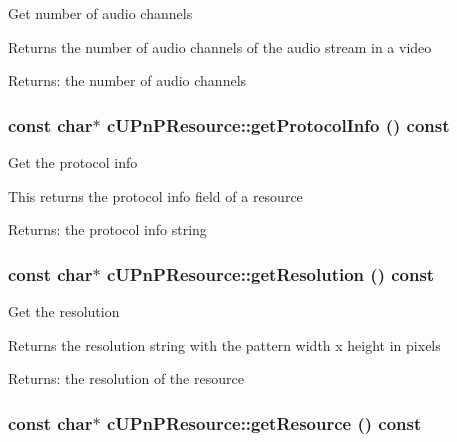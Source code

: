 Get number of audio channels

Returns the number of audio channels of the audio stream in a video

\begin{Desc}
\item[Returns:]the number of audio channels \end{Desc}
\hypertarget{classcUPnPResource_0ff5e61a2d07873ae2ebdab7d87b3d9f}{
\subsubsection[{getProtocolInfo}]{\setlength{\rightskip}{0pt plus 5cm}const char$\ast$ cUPnPResource::getProtocolInfo () const}}
\label{classcUPnPResource_0ff5e61a2d07873ae2ebdab7d87b3d9f}


Get the protocol info

This returns the protocol info field of a resource

\begin{Desc}
\item[Returns:]the protocol info string \end{Desc}
\hypertarget{classcUPnPResource_27d5140dc72a8e034ce197913d6aa1d5}{
\subsubsection[{getResolution}]{\setlength{\rightskip}{0pt plus 5cm}const char$\ast$ cUPnPResource::getResolution () const}}
\label{classcUPnPResource_27d5140dc72a8e034ce197913d6aa1d5}


Get the resolution

Returns the resolution string with the pattern width x height in pixels

\begin{Desc}
\item[Returns:]the resolution of the resource \end{Desc}
\hypertarget{classcUPnPResource_b648a88993b0e5a4421514f45a5b266f}{
\subsubsection[{getResource}]{\setlength{\rightskip}{0pt plus 5cm}const char$\ast$ cUPnPResource::getResource () const}}
\label{classcUPnPResource_b648a88993b0e5a4421514f45a5b266f}


